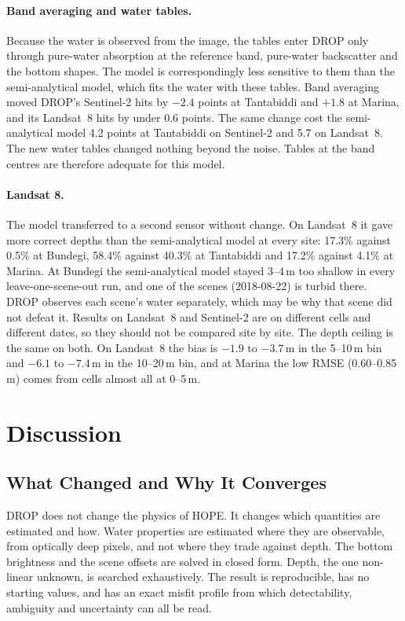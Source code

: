 \documentclass[remotesensing,article,submit,pdftex]{Definitions/mdpi}
\begin{document}
\paragraph{Band averaging and water tables.} Because the water is observed from the image, the tables enter DROP only through pure-water absorption at the reference band, pure-water backscatter and the bottom shapes. The model is correspondingly less sensitive to them than the semi-analytical model, which fits the water with these tables. Band averaging moved DROP's Sentinel-2 hits by $-2.4$ points at Tantabiddi and $+1.8$ at Marina, and its Landsat~8 hits by under 0.6 points. The same change cost the semi-analytical model 4.2 points at Tantabiddi on Sentinel-2 and 5.7 on Landsat~8. The new water tables changed nothing beyond the noise. Tables at the band centres are therefore adequate for this model.

\paragraph{Landsat 8.} The model transferred to a second sensor without change. On Landsat~8 it gave more correct depths than the semi-analytical model at every site: 17.3\% against 0.5\% at Bundegi, 58.4\% against 40.3\% at Tantabiddi and 17.2\% against 4.1\% at Marina. At Bundegi the semi-analytical model stayed 3--4\,m too shallow in every leave-one-scene-out run, and one of the scenes (2018-08-22) is turbid there. DROP observes each scene's water separately, which may be why that scene did not defeat it. Results on Landsat~8 and Sentinel-2 are on different cells and different dates, so they should not be compared site by site. The depth ceiling is the same on both. On Landsat~8 the bias is $-1.9$ to $-3.7$\,m in the 5--10\,m bin and $-6.1$ to $-7.4$\,m in the 10--20\,m bin, and at Marina the low RMSE (0.60--0.85\,m) comes from cells almost all at 0--5\,m.

\section{Discussion}\label{sec:discussion}

\subsection{What Changed and Why It Converges}

DROP does not change the physics of HOPE. It changes which quantities are estimated and how. Water properties are estimated where they are observable, from optically deep pixels, and not where they trade against depth. The bottom brightness and the scene offsets are solved in closed form. Depth, the one non-linear unknown, is searched exhaustively. The result is reproducible, has no starting values, and has an exact misfit profile from which detectability, ambiguity and uncertainty can all be read.
\end{document}

